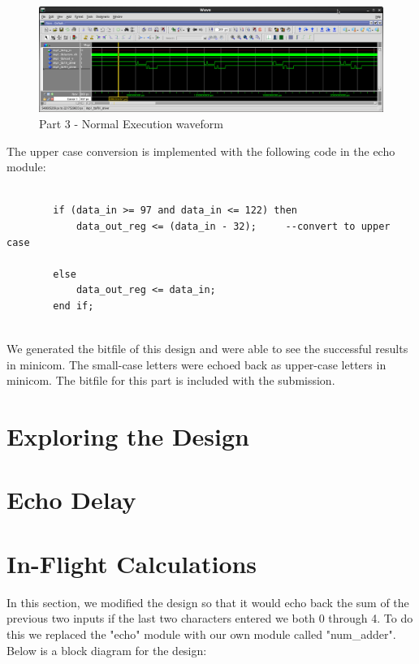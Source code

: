 \documentclass{article}
\begin{document}
	\begin{figure}[h]
		\begin{center}
			\includegraphics[scale=0.35]{../part3_files/MP1-Normal_Execution.png}
			\caption{Part 3 - Normal Execution waveform}
		\end{center}
	\end{figure}

The upper case conversion is implemented with the following code in the echo module:

\begin{center}

	\begin{lstlisting}[style=vhdl]
	
		if (data_in >= 97 and data_in <= 122) then
			data_out_reg <= (data_in - 32);		--convert to upper case
			
		else
			data_out_reg <= data_in;
		end if;
	
	\end{lstlisting}

\end{center}

We generated the bitfile of this design and were able to see the successful results in minicom. The small-case letters were echoed back as upper-case letters in minicom. The bitfile for this part is included with the submission.


\section{Exploring the Design}




\section{Echo Delay}



\section{In-Flight Calculations}
In this section, we modified the design so that it would echo back the sum of the previous two inputs if the last two characters entered we both 0 through 4. To do this we replaced the "echo" module with our own module called "num\_adder". Below is a block diagram for the design: \\
\end{document}
